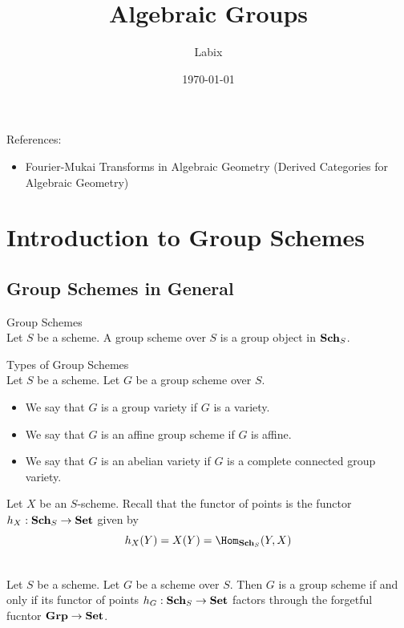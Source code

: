 \documentclass[a4paper]{article}
\title{Algebraic Groups}
\author{Labix}
\date{\today}
\begin{document}
\maketitle
\begin{abstract}
\end{abstract}

References: 
\begin{itemize}
\item Fourier-Mukai Transforms in Algebraic Geometry (Derived Categories for Algebraic Geometry)
\end{itemize}
\pagebreak
\tableofcontents

\pagebreak
\section{Introduction to Group Schemes}
\subsection{Group Schemes in General}
\begin{defn}{Group Schemes}{}\\
Let $S$ be a scheme. A group scheme over $S$ is a group object in $\bold{Sch}_S$. 
\end{defn}

\begin{defn}{Types of Group Schemes}{}\\
Let $S$ be a scheme. Let $G$ be a group scheme over $S$. 
\begin{itemize}
\item We say that $G$ is a group variety if $G$ is a variety. 
\item We say that $G$ is an affine group scheme if $G$ is affine. 
\item We say that $G$ is an abelian variety if $G$ is a complete connected group variety. 
\end{itemize}
\end{defn}

Let $X$ be an $S$-scheme. Recall that the functor of points is the functor $h_X:\bold{Sch}_S\to\bold{Set}$ given by $$h_X(Y)=X(Y)=\Hom_{\bold{Sch}_S}(Y,X)$$

\begin{lmm}{}{}\\
Let $S$ be a scheme. Let $G$ be a scheme over $S$. Then $G$ is a group scheme if and only if its functor of points $h_G:\bold{Sch}_S\to\bold{Set}$ factors through the forgetful fucntor $\bold{Grp}\to\bold{Set}$. 
\end{lmm}
\end{document}
